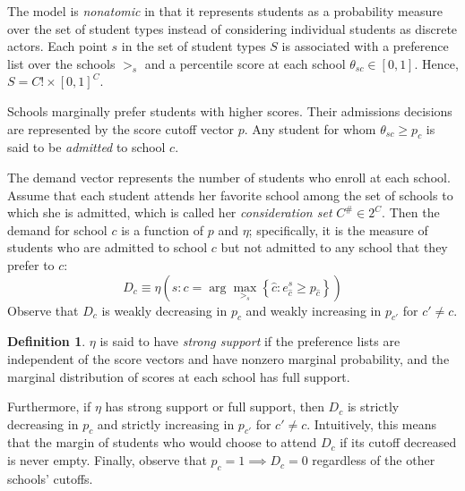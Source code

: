 \documentclass[12pt]{article}
\theoremstyle{definition}
\newtheorem{definition}{Definition}
\begin{document}
The model is \emph{nonatomic} in that it represents students as a probability measure over the set of student types instead of considering individual students as discrete actors. Each point $s$ in the set of student types $S$ is associated with a preference list over the schools $>_s$ and a percentile score at each school $\theta_{sc} \in [0,1]$. Hence, $S = C! \times [0, 1]^C$. 

Schools marginally prefer students with higher scores. Their admissions decisions are represented by the score cutoff vector $p$. Any student for whom $\theta_{sc} \geq p_c$ is said to be \emph{admitted} to school $c$. 

The demand vector represents the number of students who enroll at each school. Assume that each student attends her favorite school among the set of schools to which she is admitted, which is called her \emph{consideration set} $C^\# \in 2^C$. Then the demand for school $c$ is a function of $p$ and $\eta$; specifically, it is the measure of students who are admitted to school $c$ but not admitted to any school that they prefer to $c$:
\begin{equation} \label{demanddefinition}
D_c \equiv \eta\left(s: c = \arg \max_{>_s} \left\{\hat c: e_{\hat c}^s \geq p_{\hat c} \right\}\right)
\end{equation}
Observe that $D_c$ is weakly decreasing in $p_c$ and weakly increasing in $p_{c'}$ for $c' \neq c$.
\begin{definition}
$\eta$ is said to have \emph{strong support} if the preference lists are independent of the score vectors and have nonzero marginal probability, and the marginal distribution of scores at each school has full support. 
\end{definition}
Furthermore, if $\eta$ has strong support or full support, then $D_c$ is strictly decreasing in $p_c$ and strictly increasing in $p_{c'}$ for $c' \neq c$. Intuitively, this means that the margin of students who would choose to attend $D_c$ if its cutoff decreased is never empty. Finally, observe that $p_c = 1 \implies D_c = 0$ regardless of the other schools' cutoffs.
\end{document}

